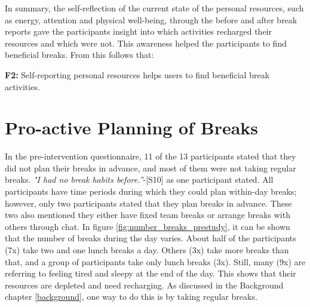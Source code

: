 \documentclass{hasel_thesis}
\begin{document}
In summary, the self-reflection of the current state of the personal resources, such as energy, attention and physical well-being, through the before and after break reports gave the participants insight into which activities recharged their resources and which were not. This awareness helped the participants to find beneficial breaks. From this follows that:

\begin{tcolorbox}[colback=white!5!white,colframe=black!75!black]
  \textbf{F2:} Self-reporting personal resources helps users to find beneficial break activities.
\end{tcolorbox}

\section{Pro-active Planning of Breaks} \label{planning_breaks}

In the pre-intervention questionnaire, 11 of the 13 participants stated that they did not plan their breaks in advance, and most of them were not taking regular breaks. \textit{"I had no break habits before.”}-[S10] as one participant stated. All participants have time periods during which they could plan within-day breaks; however, only two participants stated that they plan breaks in advance. These two also mentioned they either have fixed team breaks or arrange breaks with others through chat. In figure \ref{fig:number_breaks_prestudy}, it can be shown that the number of breaks during the day varies. About half of the participants (7x) take two and one lunch breaks a day. Others (3x) take more breaks than that, and a group of participants take only lunch breaks (3x). Still, many (9x) are referring to feeling tired and sleepy at the end of the day. This shows that their resources are depleted and need recharging. As discussed in the Background chapter \ref{background}, one way to do this is by taking regular breaks.
\end{document}
